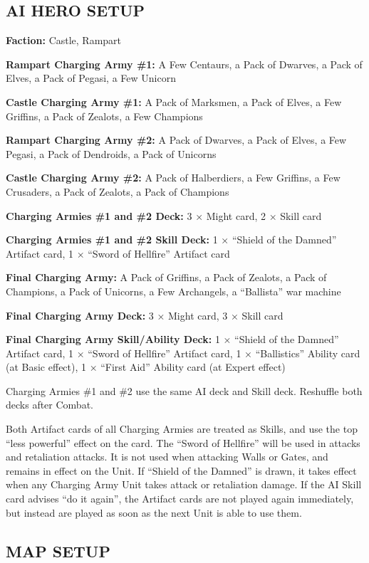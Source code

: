 \begin{multicols*}{2}
\subsection*{\MakeUppercase{AI Hero Setup}}

\textbf{Faction:} Castle, Rampart

\textbf{Rampart Charging Army \#1:} A Few Centaurs, a Pack of Dwarves, a Pack of Elves, a Pack of Pegasi, a Few Unicorn

\textbf{Castle Charging Army \#1:} A Pack of Marksmen, a Pack of Elves, a Few Griffins, a Pack of Zealots, a Few Champions

\textbf{Rampart Charging Army \#2:} A Pack of Dwarves, a Pack of Elves, a Few Pegasi, a Pack of Dendroids, a Pack of Unicorns

\textbf{Castle Charging Army \#2:} A Pack of Halberdiers, a Few Griffins, a Few Crusaders, a Pack of Zealots, a Pack of Champions

\textbf{Charging Armies \#1 and \#2 Deck:} 3 × Might card, 2 × Skill card

\textbf{Charging Armies \#1 and \#2 Skill Deck:} 1 × ``Shield of the Damned'' Artifact card, 1 × ``Sword of Hellfire'' Artifact card

\textbf{Final Charging Army:} A Pack of Griffins, a Pack of Zealots, a Pack of Champions, a Pack of Unicorns, a Few Archangels, a ``Ballista'' war machine

\textbf{Final Charging Army Deck:} 3 × Might card, 3 × Skill card

\textbf{Final Charging Army Skill/Ability Deck:} 1 × ``Shield of the Damned'' Artifact card, 1 × ``Sword of Hellfire'' Artifact card,
  1 × ``Ballistics'' Ability card (at Basic effect), 1 × ``First Aid'' Ability card (at Expert effect)

Charging Armies \#1 and \#2 use the same AI deck and Skill deck. Reshuffle both decks after Combat.

Both Artifact cards of all Charging Armies are treated as Skills, and use the top ``less powerful'' effect on the card.
The ``Sword of Hellfire'' will be used in attacks and retaliation attacks. It is not used when attacking Walls or Gates,
and remains in effect on the Unit. If ``Shield of the Damned'' is drawn, it takes effect when
any Charging Army Unit takes attack or retaliation damage. If the AI Skill card advises ``do it again'', the Artifact
cards are not played again immediately, but instead are played as soon as the next Unit is able to use them.

\subsection*{\MakeUppercase{Map setup}}


\end{multicols*}
